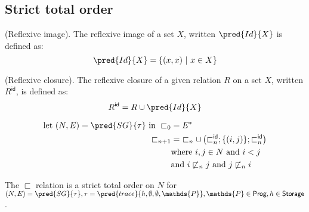 \subsection{Strict total order}

 (Reflexive image). The reflexive image of a set $X$, written $\pred{Id}{X}$ is defined as:
\[
	\pred{Id}{X} = \{ (x, x)\ |\ x \in X \}
\]

 (Reflexive closure). The reflexive closure of a given relation $R$ on a set $X$, written $R^\mathsf{id}$, is defined as:
\[
	R^\mathsf{id} = R \cup \pred{Id}{X}
\]

\begin{align*}
	\text{let } (N, E) = \pred{SG}{\tau} \text{ in }
	\sqsubset_0 &= E^* \\
	\sqsubset_{n + 1} &=\ \sqsubset_n \cup \left( \sqsubset_n^\mathsf{id} ; \{ (i, j) \} ; \sqsubset_n^\mathsf{id} \right) \\
	&\text{where } i, j \in N \text{ and } i < j \\
	&\text{and } i \not\sqsubset_n j \text{ and } j \not\sqsubset_n i
\end{align*}

\thm The $\sqsubset$ relation is a strict total order on $N$ for $(N, E) = \pred{SG}{\tau}, \tau = \pred{trace}{h, \emptyset, \emptyset, \mathds{P}}, \mathds{P} \in \mathsf{Prog}, h \in \mathsf{Storage}$.

